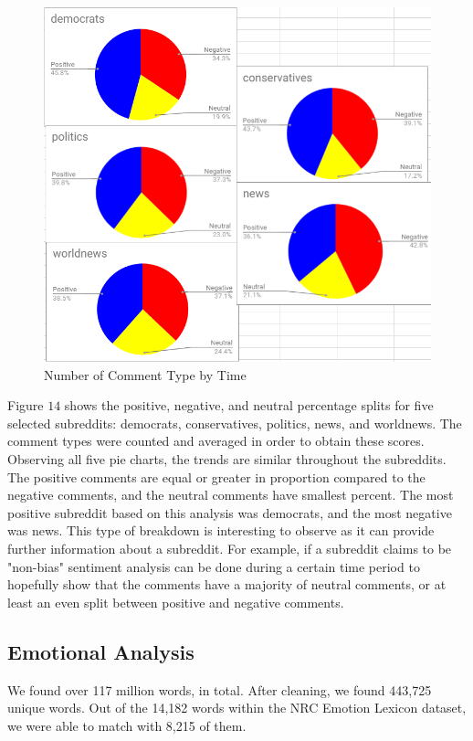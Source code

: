 \documentclass[letterpaper]{article}
\begin{document}
\begin{figure}[!htb]
\begin{center}
\includegraphics[scale=0.4]{sentiment_subreddit_vertical.PNG}
\caption{Number of Comment Type by Time}
\label{fig1}
\end{center}
\end{figure}
\par
Figure $14$ shows the positive, negative, and neutral percentage splits for five selected subreddits: democrats, conservatives, politics, news, and worldnews. The comment types were counted and averaged in order to obtain these scores. Observing all five pie charts, the trends are similar throughout the subreddits. The positive comments are equal or greater in proportion compared to the negative comments, and the neutral comments have smallest percent. The most positive subreddit based on this analysis was democrats, and the most negative was news. This type of breakdown is interesting to observe as it can provide further information about a subreddit. For example, if a subreddit claims to be "non-bias" sentiment analysis can be done during a certain time period to hopefully show that the comments have a majority of neutral comments, or at least an even split between positive and negative comments.


\subsection{Emotional Analysis}
We found over 117 million words, in total. After cleaning, we found 443,725 unique words. Out of the 14,182 words within the NRC Emotion Lexicon dataset, we were able to match with 8,215 of them.
\end{document}
